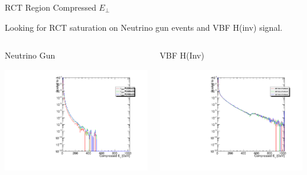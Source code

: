 \documentclass[8pt]{beamer}
\begin{document}
\begin{frame}{RCT Region Compressed $E_{\perp}$}

Looking for RCT saturation on Neutrino gun events and VBF H(inv) signal.

\begin{columns}
 
\begin{block}{Neutrino Gun}
\centering

\includegraphics[width=\linewidth]{fig/RCTRegion_Val_NG.pdf}

\end{block}

\begin{block}{VBF H(Inv)}
\centering

\includegraphics[width=\linewidth]{fig/RCTRegion_Val_Sig.pdf}


\end{block}
\end{columns}
\end{frame}
\end{document}
